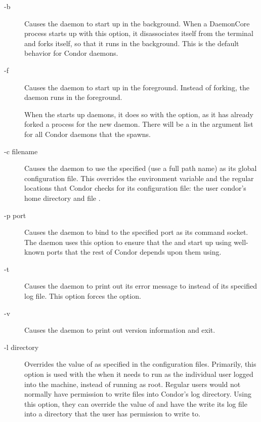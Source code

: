 \begin{description}

\item[-b] Causes the daemon to start up in the background.  When a
  DaemonCore process starts up with this option, it disassociates itself
  from the terminal and forks itself, so that it runs in the
  background.  This is the default behavior for Condor daemons.

\item[-f] Causes the daemon to start up in the foreground.  Instead of
  forking, the daemon runs in the foreground.  

  \Note When the  starts up daemons, it does
  so with the  option, as it has already forked a process for the
  new daemon.  There will be a  in the argument list for all
  Condor daemons that the  spawns.

\item[-c filename] Causes the daemon to use the specified 
  (use a full path name) as its global configuration file.  This
  overrides the  environment variable and the
  regular locations that Condor checks for its configuration file: the 
  user condor's
  home directory and file .  

\item[-p port] Causes the daemon to bind to the specified port as its
  command socket.  The  daemon
  uses this option to ensure that the
   and  start up using
  well-known ports that the rest of Condor depends upon them using.

\item[-t] Causes the daemon to print out its error message to
   instead of its specified log file.  This option forces
  the  option.

\item[-v] Causes the daemon to print out version information and
  exit.

\item[-l directory] Overrides the value of  as specified in
  the configuration files.  Primarily, this option is used with the
   when it needs to run as the individual user logged
  into the machine, instead of running as root.  Regular users would
  not normally have permission to write files into Condor's log
  directory.  Using this option, they can override the value of
   and have the  write its log file into a
  directory that the user has permission to write to.


\end{description}
